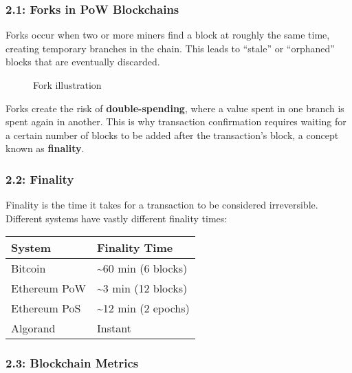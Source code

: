 \subsubsection{2.1: Forks in PoW
Blockchains}\label{forks-in-pow-blockchains}

Forks occur when two or more miners find a block at roughly the same
time, creating temporary branches in the chain. This leads to ``stale''
or ``orphaned'' blocks that are eventually discarded.

\begin{figure}
\centering
\caption{Fork illustration}
\end{figure}

Forks create the risk of \textbf{double-spending}, where a value spent
in one branch is spent again in another. This is why transaction
confirmation requires waiting for a certain number of blocks to be added
after the transaction's block, a concept known as \textbf{finality}.

\subsubsection{2.2: Finality}\label{finality}

Finality is the time it takes for a transaction to be considered
irreversible. Different systems have vastly different finality times:

\begin{center}
\begin{tabular}{ll}
	\toprule
	System & Finality Time \\
	\midrule
	Bitcoin & \textasciitilde60 min (6 blocks) \\
	Ethereum PoW & \textasciitilde3 min (12 blocks) \\
	Ethereum PoS & \textasciitilde12 min (2 epochs) \\
	Algorand & Instant \\
	\bottomrule
		
\end{tabular}
\end{center}

\subsubsection{2.3: Blockchain Metrics}\label{blockchain-metrics}

